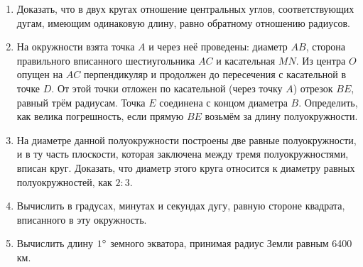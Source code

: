 \begin{enumerate}

\item
Доказать, что в двух кругах отношение центральных углов, соответствующих дугам, имеющим одинаковую длину, равно обратному отношению радиусов.

\item
На окружности взята точка $A$ и через неё проведены:
диаметр $AB$, сторона правильного вписанного шестиугольника $AC$ и касательная $MN$.
Из центра $O$ опущен на $AC$ перпендикуляр и продолжен до пересечения с касательной в точке $D$.
От этой точки отложен по касательной (через точку $A$) отрезок $BE$, равный трём радиусам.
Точка $E$ соединена с концом диаметра $B$.
Определить, как велика погрешность, если прямую $BE$ возьмём за длину полуокружности.

\item
На диаметре данной полуокружности построены две равные полуокружности, и в ту часть плоскости, которая заключена между тремя полуокружностями, вписан круг.
Доказать, что диаметр этого круга относится к диаметру равных полуокружностей, как $2:3$.

\item
Вычислить в градусах, минутах и секундах дугу, равную стороне квадрата, вписанного в эту окружность.

\item
Вычислить длину $1\degree$ земного экватора, принимая радиус Земли равным 6400 км.

\end{enumerate}
